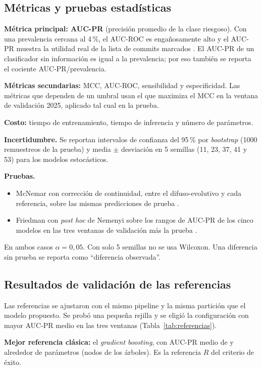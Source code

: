 \subsection{Métricas y pruebas estadísticas}

\textbf{Métrica principal: AUC-PR} (precisión promedio de la clase riesgoso). Con una prevalencia cercana al 4\,\%, el AUC-ROC es engañosamente alto y el AUC-PR muestra la utilidad real de la lista de commits marcados \cite{Saito2015}. El AUC-PR de un clasificador sin información es igual a la prevalencia; por eso también se reporta el cociente AUC-PR/prevalencia.

\textbf{Métricas secundarias:} MCC, AUC-ROC, sensibilidad y especificidad. Las métricas que dependen de un umbral usan el que maximiza el MCC en la ventana de validación 2025, aplicado tal cual en la prueba.

\textbf{Costo:} tiempo de entrenamiento, tiempo de inferencia y número de parámetros.

\textbf{Incertidumbre.} Se reportan intervalos de confianza del 95\,\% por \emph{bootstrap} (1000 remuestreos de la prueba) y media $\pm$ desviación en 5 semillas (11, 23, 37, 41 y 53) para los modelos estocásticos.

\textbf{Pruebas.}
\begin{itemize}
\item McNemar con corrección de continuidad, entre el difuso-evolutivo y cada referencia, sobre las mismas predicciones de prueba \cite{Dietterich1998}.
\item Friedman con \emph{post hoc} de Nemenyi sobre los rangos de AUC-PR de los cinco modelos en las tres ventanas de validación más la prueba \cite{Demsar2006}.
\end{itemize}
En ambos casos $\alpha=0{,}05$. Con solo 5 semillas no se usa Wilcoxon. Una diferencia sin prueba se reporta como ``diferencia observada''.

\subsection{Resultados de validación de las referencias}

Las referencias se ajustaron con el mismo pipeline y la misma partición que el modelo propuesto. Se probó una pequeña rejilla y se eligió la configuración con mayor AUC-PR medio en las tres ventanas (Tabla~\ref{tab:referencias}).

\textbf{Mejor referencia clásica:} el \emph{gradient boosting}, con AUC-PR medio de \cifValGB{} y alrededor de \cifParamGB{} parámetros (nodos de los árboles). Es la referencia $R$ del criterio de éxito.

